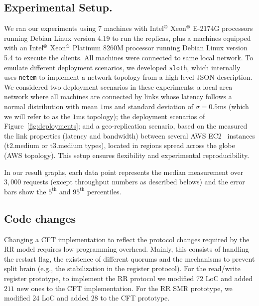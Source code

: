 \subsection{Experimental Setup.}
We ran our experiments using 7 machines  with
Intel$^\text{\textregistered}$ Xeon$^\text{\textregistered}$ E-2174G
processors running Debian Linux version 4.19 to run the replicas,
plus a machines equipped with an Intel$^\text{\textregistered}$
Xeon$^\text{\textregistered}$ Platinum 8260M processor running Debian
Linux version 5.4 to execute the clients.
%
All machines were connected to same local network. To emulate
different deployment scenarios, we developed
\texttt{sloth}\cite{sloth}, which internally uses
\texttt{netem}\cite{netem} to implement a network topology from a
high-level JSON description. We considered two deployment
scenarios in these experiments: a local area network where all
machines are connected by links whose latency follows a normal
distribution with mean $1$ms and standard deviation of $\sigma =
0.5$ms (which we will refer to as the $1$ms topology); the
deployment scenarios of Figure~\ref{fig:deployments}; and a
geo-replication scenario, based on the measured the link
properties (latency and bandwidth) between several AWS
EC2~\cite{ec2} instances (t2.medium or t3.medium types), located
in regions spread across the globe (AWS topology). This setup
ensures flexibility and experimental reproducibility.

In our result graphs, each data point represents the median
measurement over $3,000$ requests (except throughput numbers as
described belows) and the error bars show the $5^{\text{th}}$ and
$95^{\text{th}}$ percentiles.

\subsection{Code changes}\label{ssec:implementation_effort}

Changing a \ac{CFT} implementation to reflect the protocol changes
required by the \ac{RR} model requires low programming
overhead. Mainly, this consists of handling the restart
flag, the existence of different quorums and the mechanisms to
prevent split brain (e.g., the stabilization in the register
protocol). For the read/write register prototype, to
implement the \ac{RR} protocol we modified $72$ LoC and added
$211$ new ones to the \ac{CFT} implementation. For the \ac{RR} SMR
prototype, we modified $24$ LoC and added $28$ to the \ac{CFT}
prototype.

